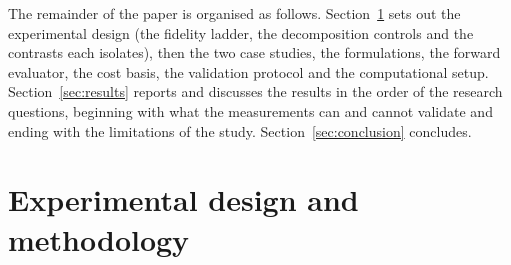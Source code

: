 \documentclass[a4paper,fleqn]{cas-sc}
\begin{document}
The remainder of the paper is organised as follows.
Section~\ref{sec:methodology} sets out the experimental design (the fidelity ladder, the
decomposition controls and the contrasts each isolates), then the two case studies, the
formulations, the forward evaluator, the cost basis, the validation protocol and the
computational setup. Section~\ref{sec:results} reports and discusses the results in the
order of the research questions, beginning with what the measurements can and cannot
validate and ending with the limitations of the study.
Section~\ref{sec:conclusion} concludes.

\section{Experimental design and methodology}
\label{sec:methodology}
\end{document}

